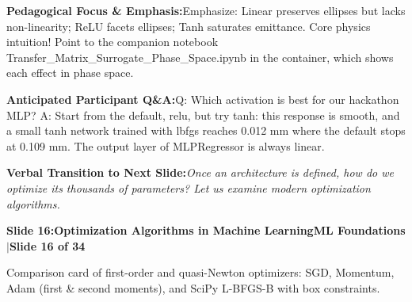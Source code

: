 \documentclass[11pt,a4paper]{article}
\begin{document}
\begin{tcolorbox}[colback=lightbg,colframe=bordergray,left=6pt,right=6pt,top=3pt,bottom=3pt,boxrule=0.6pt,arc=2.5pt]
\small
\noindent\textbf{\color{navy}Pedagogical Focus \& Emphasis:}\enspace Emphasize: Linear preserves ellipses but lacks non-linearity; ReLU facets ellipses; Tanh saturates emittance. Core physics intuition! Point to the companion notebook Transfer\_Matrix\_Surrogate\_Phase\_Space.ipynb in the container, which shows each effect in phase space.\par\vspace{0.3em}
\noindent\textbf{\color{successgreen}Anticipated Participant Q\&A:}\enspace Q: Which activation is best for our hackathon MLP? A: Start from the default, relu, but try tanh: this response is smooth, and a small tanh network trained with lbfgs reaches 0.012 mm where the default stops at 0.109 mm. The output layer of MLPRegressor is always linear.\par\vspace{0.3em}
\noindent\textbf{\color{accent}Verbal Transition to Next Slide:}\enspace \emph{Once an architecture is defined, how do we optimize its thousands of parameters? Let us examine modern optimization algorithms.}
\end{tcolorbox}
\clearpage
\hypertarget{slide.16}{}
{}
\noindent\begin{tcolorbox}[colback=navy,colframe=navy,left=6pt,right=6pt,top=3pt,bottom=3pt,boxrule=0pt,arc=2pt]
{\large\bfseries\color{white}Slide 16:\enspace Optimization Algorithms in Machine Learning}\hfill{\footnotesize\bfseries\color{white!85!lightbg}ML Foundations \enspace$|$\enspace Slide 16 of 34}
\end{tcolorbox}
\vspace{0.2em}
\begin{tcolorbox}[colback=lightbg,colframe=bordergray,title={\footnotesize\bfseries\color{darkgray}Slide Visual Blueprint},fontupper=\small,left=6pt,right=6pt,top=2.5pt,bottom=2.5pt,boxrule=0.6pt,arc=2.5pt]
Comparison card of first-order and quasi-Newton optimizers: SGD, Momentum, Adam (first \& second moments), and SciPy L-BFGS-B with box constraints.
\end{tcolorbox}
\vspace{0.2em}
\end{document}
